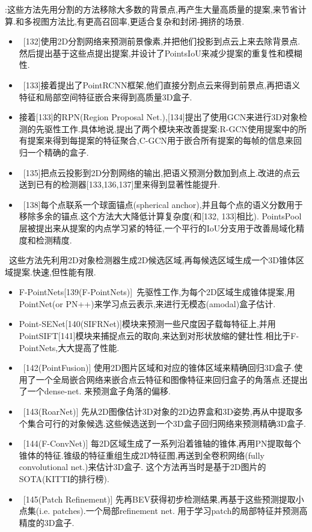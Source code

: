 \documentclass{article}
\begin{document}
:这些方法先用分割的方法移除大多数的背景点,再产生大量高质量的提案,来节省计算.和多视图方法比,有更高召回率,更适合复杂和封闭-拥挤的场景.
\begin{itemize}
    \item \ [132]使用2D分割网络来预测前景像素,并把他们投影到点云上来去除背景点.然后提出基于这些点提出提案,并设计了PointsIoU来减少提案的重复性和模糊性.
    \item \ [133]接着提出了PointRCNN框架,他们直接分割点云来得到前景点,再把语义特征和局部空间特征嵌合来得到高质量3D盒子.
    \item 接着[133]的RPN(Region Proposal Net.),[134]提出了使用GCN来进行3D对象检测的先驱性工作.具体地说,提出了两个模块来改善提案:R-GCN使用提案中的所有提案来得到每提案的特征聚合,C-GCN用于嵌合所有提案的每帧的信息来回归一个精确的盒子.
    \item \ [135]把点云投影到2D分割网络的输出,把语义预测分数加到点上.改进的点云送到已有的检测器[133,136,137]里来得到显著性能提升.
    \item \ [138]每个点联系一个球面锚点(spherical anchor),并且每个点的语义分数用于移除多余的锚点.这个方法大大降低计算复杂度(和[132, 133]相比). PointsPool层被提出来从提案的内点学习紧的特征,一个平行的IoU分支用于改善局域化精度和检测精度.
\end{itemize}

\ 这些方法先利用2D对象检测器生成2D候选区域,再每候选区域生成一个3D锥体区域提案.快速,但性能有限.

\begin{itemize}
    \item F-PointNets[139(F-PointNets)]~先驱性工作,为每个2D区域生成锥体提案,用PointNet(or PN++)来学习点云表示,来进行无模态(amodal)盒子估计.
    \item Point-SENet[140(SIFRNet)]模块来预测一些尺度因子载每特征上,并用PointSIFT[141]模块来捕捉点云的取向,来达到对形状放缩的健壮性.相比于F-PointNets,大大提高了性能.
    \item \ [142(PointFusion)] 使用2D图片区域和对应的锥体区域来精确回归3D盒子.使用了一个全局嵌合网络来嵌合点云特征和图像特征来回归盒子的角落点.还提出了一个dense-net. 来预测盒子角落的偏移.
    \item \ [143(RoarNet)] 先从2D图像估计3D对象的2D边界盒和3D姿势,再从中提取多个集合可行的对象候选.这些候选送到一个3D盒子回归网络来预测精确3D盒子.
    \item \ [144(F-ConvNet)] 每2D区域生成了一系列沿着锥轴的锥体,再用PN提取每个锥体的特征.锥级的特征重组生成2D特征图,再送到全卷积网络(fully convolutional net.)来估计3D盒子. 这个方法再当时是基于2D图片的SOTA(KITTI的排行榜).
    \item  \ [145(Patch Refinement)] 先再BEV获得初步检测结果,再基于这些预测提取小点集(i.e. patches).一个局部refinement net. 用于学习patch的局部特征并预测高精度的3D盒子.
    
\end{itemize}
\end{document}
